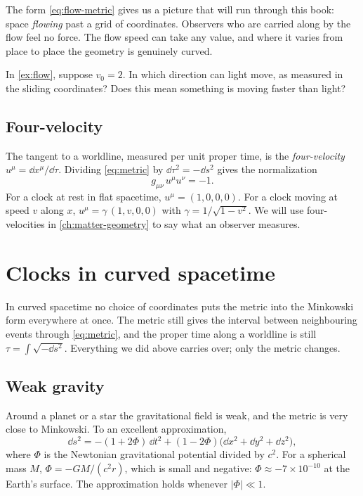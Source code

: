 The form \cref{eq:flow-metric} gives us a picture that will run through this
book: space \emph{flowing} past a grid of coordinates. Observers who are carried
along by the flow feel no force. The flow speed can take any value, and where
it varies from place to place the geometry is genuinely curved.

\begin{checkpoint}
In \cref{ex:flow}, suppose $v_{0} = 2$. In which direction can light move, as
measured in the sliding coordinates? Does this mean something is moving faster
than light?
\end{checkpoint}

\subsection{Four-velocity}

The tangent to a worldline, measured per unit proper time, is the
\emph{four-velocity} $u^{\mu} = \dd x^{\mu}/\dd\tau$. Dividing
\cref{eq:metric} by $\dd\tau^{2} = -\dd s^{2}$ gives the normalization
\begin{equation}
  g_{\mu\nu}\,u^{\mu}u^{\nu} = -1.
  \label{eq:four-velocity}
\end{equation}
For a clock at rest in flat spacetime, $u^{\mu} = (1,0,0,0)$. For a clock moving
at speed $v$ along $x$, $u^{\mu} = \gamma\,(1, v, 0, 0)$ with
$\gamma = 1/\sqrt{1-v^{2}}$. We will use four-velocities in
\cref{ch:matter-geometry} to say what an observer measures.

\section{Clocks in curved spacetime}\label{sec:clocks}

In curved spacetime no choice of coordinates puts the metric into the
Minkowski form everywhere at once. The metric still gives the interval between
neighbouring events through \cref{eq:metric}, and the proper time along a
worldline is still $\tau = \int\sqrt{-\dd s^{2}}$. Everything we did above
carries over; only the metric changes.

\subsection{Weak gravity}

Around a planet or a star the gravitational field is weak, and the metric is
very close to Minkowski. To an excellent approximation,
\begin{equation}
  \dd s^{2} = -(1 + 2\Phi)\,\dd t^{2} + (1 - 2\Phi)\bigl(\dd x^{2} + \dd y^{2} + \dd z^{2}\bigr),
  \label{eq:weak-field}
\end{equation}
where $\Phi$ is the Newtonian gravitational potential divided by $c^{2}$. For a
spherical mass $M$, $\Phi = -GM/(c^{2}r)$, which is small and negative:
$\Phi \approx -7\times10^{-10}$ at the Earth's surface. The approximation holds
whenever $|\Phi| \ll 1$.

